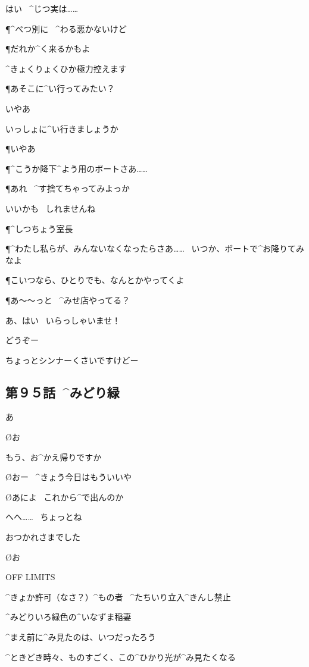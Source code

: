 \AM はい
\ ^{じつ}{実}は……

\P ^{べつ}{別}に
\ ^{わる}{悪}かないけど

\P だれか^{く}{来}るかもよ

\AM ^{きょくりょくひか}{極力控}えます

\page
\P あそこに^{い}{行}ってみたい？

\AM いやあ

\AM いっしょに^{い}{行}きましょうか

\P いやあ

\page
\P ^{こうか}{降下}^{よう}{用}のボートさあ……

\P あれ
\ ^{す}{捨}てちゃってみよっか

\AM いいかも
\ しれませんね

\page
\P ^{しつちょう}{室長}

\P ^{わたし}{私}らが、みんないなくなったらさあ……
\ いつか、ボートで^{お}{降}りてみなよ

\P こいつなら、ひとりでも、なんとかやってくよ

\page[102]
\P あ〜〜っと
\ ^{みせ}{店}やってる？

\A あ、はい
\ いらっしゃいませ！

\A どうぞー

\A ちょっとシンナーくさいですけどー


\subsection{第９５話\ ^{みどり}{緑}}

\page[107]
\A あ

\O お

\A もう、お^{かえ}{帰}りですか

\O おー
\ ^{きょう}{今日}はもういいや

\O あによ
\ これから^{で}{出}んのか

\A へへ……
\ ちょっとね

\A おつかれさまでした

\O お

\page[111]
\Sign OFF LIMITS

\Sign ^{きょか}{許可}（なさ？）^{もの}{者}
\ ^{たちいり}{立入}^{きんし}{禁止}

\page
\A ^{みどりいろ}{緑色}の^{いなずま}{稲妻}

\A ^{まえ}{前}に^{み}{見}たのは、いつだったろう

\page
\A ^{ときどき}{時々}、ものすごく、この^{ひかり}{光}が^{み}{見}たくなる

